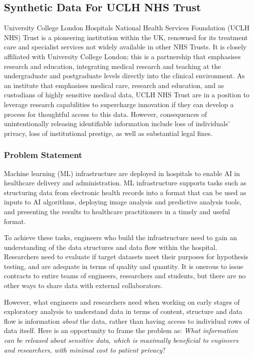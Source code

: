 \documentclass[11pt]{article}
\begin{document}
\subsection{Synthetic Data For UCLH NHS Trust}

University College London Hospitals National Health Services Foundation (UCLH NHS) Trust  is a pioneering institution within the UK, renowned for its treatment care and specialist services not widely available in other NHS Trusts. It is closely affiliated with University College London; this is a partnership that emphasises research and education, integrating medical research and teaching at the undergraduate and postgraduate levels directly into the clinical environment. 
As an institute that emphasises medical care, research and education, and as custodians of highly sensitive medical data, UCLH NHS Trust are in a position to leverage research capabilities to supercharge innovation if they can develop a process for thoughtful access to this data. 
However, consequences of unintentionally releasing identifiable information include loss of individuals' privacy, loss of institutional prestige, as well as substantial legal fines.

\subsubsection{Problem Statement}

Machine learning (ML) infrastructure are deployed in hospitals to enable AI in healthcare delivery and administration. ML infrastructure supports tasks such as structuring data from electronic health records into a format that can be used as inputs to AI algorithms, deploying image analysis and predictive analysis tools, and presenting the results to healthcare practitioners in a timely and useful format.

To achieve these tasks, engineers who build the infrastructure need to gain an understanding of the data structures and data flow within the hospital. Researchers need to evaluate if target datasets meet their purposes for hypothesis testing, and are adequate in terms of quality and quantity. It is onerous to issue contracts to entire teams of engineers, researchers and students, but there are no other ways to share data with external collaborators. 

However, what engineers and researchers need when working on early stages of exploratory analysis to  understand data in terms of content, structure and data flow is information \emph{about} the data, rather than having access to individual rows of data itself. Here is an  opportunity to frame the problem as: \emph{What information can be released about sensitive data, which is maximally beneficial to engineers and researchers, with minimal cost to patient privacy}?
\end{document}

